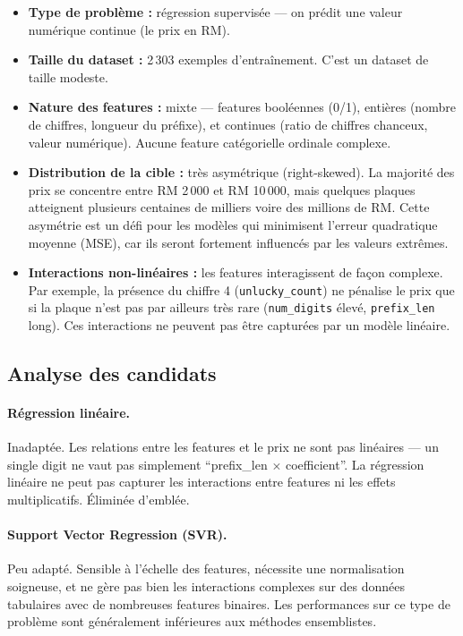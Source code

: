 \documentclass[12pt, a4paper]{article}
\begin{document}
\begin{itemize}
  \item \textbf{Type de problème :} régression supervisée — on prédit une valeur numérique continue (le prix en RM).
  \item \textbf{Taille du dataset :} 2\,303 exemples d'entraînement. C'est un dataset de taille modeste.
  \item \textbf{Nature des features :} mixte — features booléennes (0/1), entières (nombre de chiffres, longueur du préfixe), et continues (ratio de chiffres chanceux, valeur numérique). Aucune feature catégorielle ordinale complexe.
  \item \textbf{Distribution de la cible :} très asymétrique (right-skewed). La majorité des prix se concentre entre RM 2\,000 et RM 10\,000, mais quelques plaques atteignent plusieurs centaines de milliers voire des millions de RM. Cette asymétrie est un défi pour les modèles qui minimisent l'erreur quadratique moyenne (MSE), car ils seront fortement influencés par les valeurs extrêmes.
  \item \textbf{Interactions non-linéaires :} les features interagissent de façon complexe. Par exemple, la présence du chiffre 4 (\texttt{unlucky\_count}) ne pénalise le prix que si la plaque n'est pas par ailleurs très rare (\texttt{num\_digits} élevé, \texttt{prefix\_len} long). Ces interactions ne peuvent pas être capturées par un modèle linéaire.
\end{itemize}

\subsection{Analyse des candidats}

\paragraph{Régression linéaire.}
Inadaptée. Les relations entre les features et le prix ne sont pas linéaires — un single digit ne vaut pas simplement ``prefix\_len $\times$ coefficient''. La régression linéaire ne peut pas capturer les interactions entre features ni les effets multiplicatifs. Éliminée d'emblée.

\paragraph{Support Vector Regression (SVR).}
Peu adapté. Sensible à l'échelle des features, nécessite une normalisation soigneuse, et ne gère pas bien les interactions complexes sur des données tabulaires avec de nombreuses features binaires. Les performances sur ce type de problème sont généralement inférieures aux méthodes ensemblistes.
\end{document}
